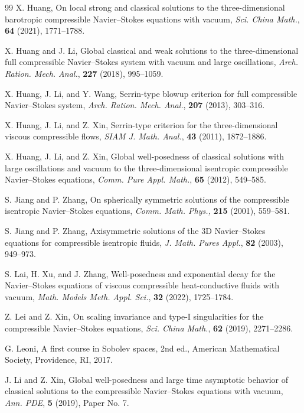 \documentclass[11pt]{article}
\begin{document}
\begin{thebibliography}{99}
 X. Huang,
On local strong and classical solutions to the three-dimensional barotropic compressible Navier--Stokes equations with vacuum,
{\it Sci. China Math.}, {\bf 64} (2021), 1771--1788.

 X. Huang and J. Li,
Global classical and weak solutions to the three-dimensional full compressible Navier--Stokes system with vacuum and large oscillations,
{\it Arch. Ration. Mech. Anal.}, {\bf 227} (2018), 995--1059.

 X. Huang, J. Li, and Y. Wang,
Serrin-type blowup criterion for full compressible Navier--Stokes system,
{\it Arch. Ration. Mech. Anal.}, {\bf 207} (2013), 303--316.

 X. Huang, J. Li, and Z. Xin,
Serrin-type criterion for the three-dimensional viscous compressible flows,
{\it SIAM J. Math. Anal.}, {\bf 43} (2011), 1872--1886.

 X. Huang, J. Li, and Z. Xin,
Global well-posedness of classical solutions with large oscillations and vacuum to the three-dimensional isentropic compressible Navier--Stokes equations,
{\it Comm. Pure Appl. Math.}, {\bf 65} (2012), 549--585.

S. Jiang and P. Zhang, On spherically symmetric solutions of the compressible isentropic Navier--Stokes equations, \textit{Comm. Math. Phys.,} \textbf{215} (2001), 559--581.

S. Jiang and P. Zhang, Axisymmetric solutions of the 3D Navier--Stokes equations for compressible isentropic fluids, {\it J. Math. Pures Appl.}, {\bf 82} (2003), 949--973.

 S. Lai, H. Xu, and J. Zhang,
Well-posedness and exponential decay for the Navier--Stokes equations of viscous compressible heat-conductive fluids with vacuum,
{\it Math. Models Meth. Appl. Sci.}, {\bf 32} (2022), 1725--1784.

 Z. Lei and Z. Xin,
On scaling invariance and type-I singularities for the compressible Navier--Stokes equations, {\it Sci. China Math.}, {\bf 62} (2019), 2271--2286.

G. Leoni, A first course in Sobolev spaces, 2nd ed., American Mathematical Society, Providence, RI, 2017.

 J. Li and Z. Xin,
Global well-posedness and large time asymptotic behavior of classical solutions to the compressible Navier--Stokes equations with vacuum,
{\it Ann. PDE}, {\bf 5} (2019), Paper No. 7.


\end{thebibliography}
\end{document}
